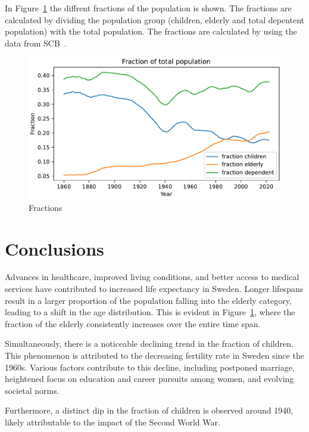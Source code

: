 \documentclass[a4paper]{article}
\begin{document}
\newpage

In Figure~\ref{fig:fractions} the diffrent fractions of the population is shown. The fractions 
are calculated by dividing the population group (children, elderly and total depentent population) with the total population. 
The fractions are calculated by using the data from SCB~\cite{SCB:2023}.


\begin{figure}[h]
  \begin{center}
    \includegraphics[width=\textwidth]{fractions.pdf}
    \caption{Fractions}
    \label{fig:fractions}
  \end{center}
\end{figure}


\section*{Conclusions}
Advances in healthcare, improved living conditions, and better access to medical services have contributed to increased life 
expectancy in Sweden. Longer lifespans result in a larger proportion of the population falling into the elderly category,
leading to a shift in the age distribution. This is evident in Figure~\ref{fig:fractions}, where the fraction of the elderly consistently increases over the entire time span.

Simultaneously, there is a noticeable declining trend in the fraction of children. This phenomenon is attributed to the decreasing fertility rate in Sweden since the 1960s. 
Various factors contribute to this decline, including postponed marriage, heightened focus on education and career pursuits among women, and evolving societal norms.

Furthermore, a distinct dip in the fraction of children is observed around 1940, likely attributable to the impact of the Second World War.
\end{document}
